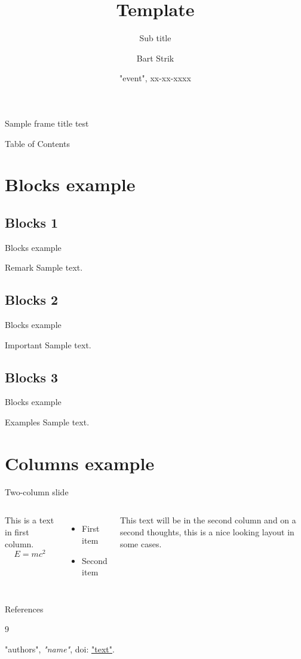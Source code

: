 \documentclass{beamer}
\title{Template}
\subtitle{Sub title}
\author{Bart Strik}
\institute[HSLU]
{
    Institute Elektrotechnik \\
    CC ISN \\
    HSLU
}
\date{"event", xx-xx-xxxx}
\begin{document}
\frame{\titlepage}

\begin{frame}{Sample frame title}
    test
\end{frame}

\begin{frame}{Table of Contents}
    \tableofcontents
\end{frame}

\section{Blocks example}
\subsection{Blocks 1}
\begin{frame}{Blocks example}
    \begin{block}{Remark}
        Sample text.
    \end{block}
\end{frame}

\subsection{Blocks 2}
\begin{frame}{Blocks example}
    \begin{alertblock}{Important}
        Sample text.
    \end{alertblock}
\end{frame}

\subsection{Blocks 3}
\begin{frame}{Blocks example}
    \begin{examples}{Examples}
        Sample text.
    \end{examples}
\end{frame}

\section{Columns example}
\begin{frame}{Two-column slide}
    \begin{columns}
            This is a text in first column.
            $$E=mc^2$$
            \begin{itemize}
                \item First item
                \item Second item
            \end{itemize}

            This text will be in the second column
            and on a second thoughts, this is a nice looking
            layout in some cases.
    \end{columns}
\end{frame}

\begin{frame}[allowframebreaks]{References}
    \begin{thebibliography}{9}

        "authors",
        \textit{"name"},
        doi: \href{"link"}{"text"}.

\end{thebibliography}
\end{frame}
\end{document}
